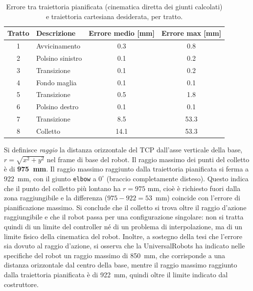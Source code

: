 \begin{table}[h]
    \centering
    \begin{tabular}{clcc}
        \toprule
        Tratto & Descrizione      & Errore medio [mm] & Errore max [mm] \\
        \midrule
        1      & Avvicinamento    & 0.3               & 0.8             \\
        2      & Polsino sinistro & 0.1               & 0.2             \\
        3      & Transizione      & 0.1               & 0.2             \\
        4      & Fondo maglia     & 0.1               & 0.1             \\
        5      & Transizione      & 0.5               & 1.8             \\
        6      & Polsino destro   & 0.1               & 0.1             \\
        7      & Transizione      & 8.5               & 53.3            \\
        8      & Colletto         & 14.1              & 53.3            \\
        \bottomrule
    \end{tabular}
    \caption{Errore tra traiettoria pianificata (cinematica diretta dei giunti
        calcolati) e traiettoria cartesiana desiderata, per tratto.}
    \label{tab:pian}
\end{table}

Si definisce \emph{raggio} la distanza orizzontale del TCP dall'asse
verticale della base, $r=\sqrt{x^2+y^2}$ nel frame di base del robot. Il
raggio massimo dei punti del colletto è di \textbf{975~mm}. Il raggio massimo raggiunto dalla traiettoria pianificata si ferma a
922~mm, con il giunto \texttt{elbow} a $0^\circ$ (braccio completamente
disteso). Questo indica che il punto del colletto più lontano ha $r = 975$ mm, cioè è richiesto fuori dalla zona raggiungibile
e la differenza ($975-922 = 53$~mm) coincide con l'errore di pianificazione massimo.
Si conclude che il colletto si trova oltre il raggio d'azione raggiungibile e che il robot
passa per una configurazione singolare: non si tratta quindi di un limite del
controller né di un problema di interpolazione, ma di un limite fisico della cinematica del robot.
\newline
Inoltre, a sostegno della tesi che l'errore sia dovuto al raggio d'azione, si osserva che la UniversalRobots ha indicato nelle specifiche del robot
un raggio massimo di 850~mm, che corrisponde a una distanza orizzontale dal centro della base, mentre il raggio massimo raggiunto dalla traiettoria pianificata è di 922~mm, quindi oltre il limite indicato dal costruttore.


